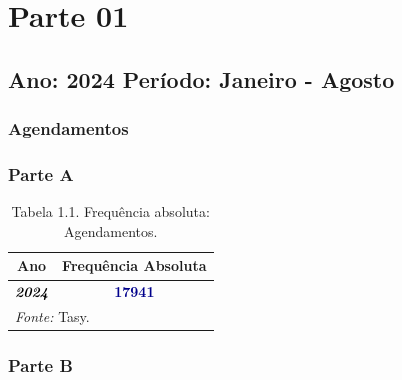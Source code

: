\documentclass[
  letterpaper,
  DIV=11,
  numbers=noendperiod]{scrreprt}
\begin{document}
\begin{verbatim}
\end{verbatim}

\part{Parte 01}

\hypertarget{ano-2024-peruxedodo-janeiro---agosto}{%
\chapter*{Ano: 2024 \textbar{} Período: Janeiro -
Agosto}\label{ano-2024-peruxedodo-janeiro---agosto}}


\hypertarget{agendamentos}{%
\section*{Agendamentos}\label{agendamentos}}


\section{Parte A}

\begin{table}
\centering
\caption{Tabela 1.1. Frequência absoluta: Agendamentos.}
\centering
\begin{tabular}[t]{>{}c|>{}c}
\hline
Ano & Frequência Absoluta\\
\hline
\textcolor{black}{\em{\textbf{2024}}} & \textcolor{darkblue}{\textbf{17941}}\\
\hline
\multicolumn{2}{l}{\rule{0pt}{1em}\textit{Fonte: } Tasy.}\\
\end{tabular}
\end{table}

\section{Parte B}
\end{document}
